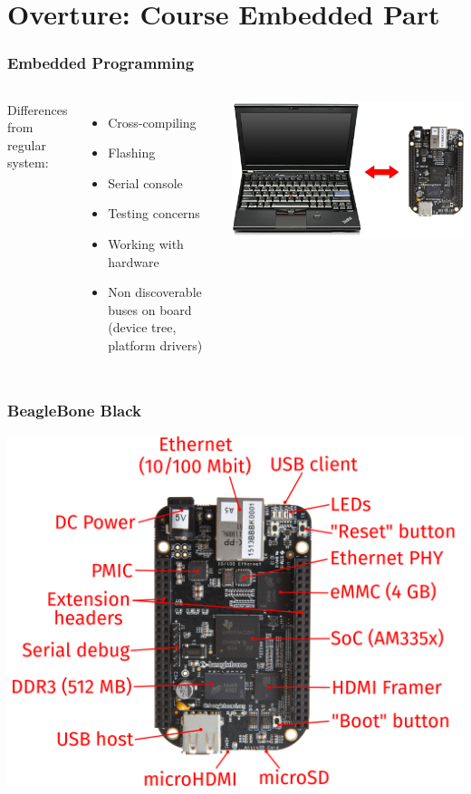 \documentclass[aspectratio=169]{beamer}
\begin{document}
\section{Overture: Course Embedded Part}

\begin{frame}
  \frametitle{Embedded Programming}
  \begin{columns}
      Differences from regular system:
      \begin{itemize}
        \item Cross-compiling
        \item Flashing
        \item Serial console
        \item Testing concerns
        \item Working with hardware
        \item Non discoverable buses on board (device tree, platform drivers)
      \end{itemize}
      \includegraphics[scale=0.27]{images/host-target.jpg}
  \end{columns}
\end{frame}

\begin{frame}
  \frametitle{BeagleBone Black}
  \begin{center}
    \includegraphics[scale=0.82]{images/bbb02.png}
  \end{center}
\end{frame}
\end{document}
